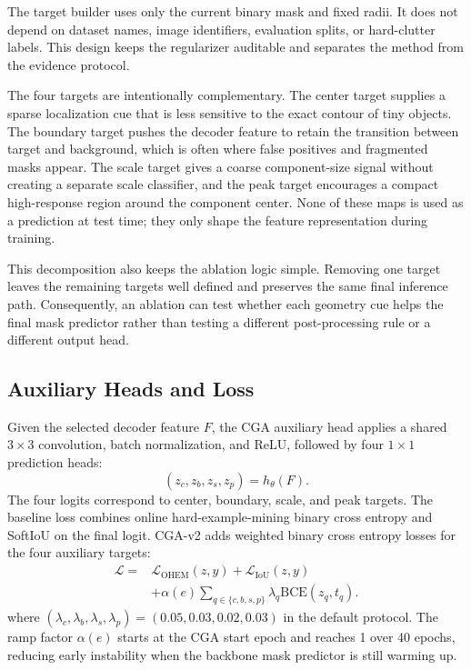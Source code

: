 \documentclass[letterpaper]{article}
\begin{document}
The target builder uses only the current binary mask and fixed radii. It does not depend on dataset names, image identifiers, evaluation splits, or hard-clutter labels. This design keeps the regularizer auditable and separates the method from the evidence protocol.

The four targets are intentionally complementary. The center target supplies a sparse localization cue that is less sensitive to the exact contour of tiny objects. The boundary target pushes the decoder feature to retain the transition between target and background, which is often where false positives and fragmented masks appear. The scale target gives a coarse component-size signal without creating a separate scale classifier, and the peak target encourages a compact high-response region around the component center. None of these maps is used as a prediction at test time; they only shape the feature representation during training.

This decomposition also keeps the ablation logic simple. Removing one target leaves the remaining targets well defined and preserves the same final inference path. Consequently, an ablation can test whether each geometry cue helps the final mask predictor rather than testing a different post-processing rule or a different output head.

\subsection{Auxiliary Heads and Loss}

Given the selected decoder feature $F$, the CGA auxiliary head applies a shared $3 \times 3$ convolution, batch normalization, and ReLU, followed by four $1 \times 1$ prediction heads:
\begin{equation}
(z_c, z_b, z_s, z_p) = h_{\theta}(F).
\end{equation}
The four logits correspond to center, boundary, scale, and peak targets. The baseline loss combines online hard-example-mining binary cross entropy and SoftIoU on the final logit. CGA-v2 adds weighted binary cross entropy losses for the four auxiliary targets:
\begin{equation}
\begin{aligned}
\mathcal{L} ={}& \mathcal{L}_{\mathrm{OHEM}}(z,y)
 + \mathcal{L}_{\mathrm{IoU}}(z,y) \\
& + \alpha(e) \sum_{q \in \{c,b,s,p\}}
 \lambda_q \mathrm{BCE}(z_q,t_q).
\end{aligned}
\end{equation}
where $(\lambda_c,\lambda_b,\lambda_s,\lambda_p)=(0.05,0.03,0.02,0.03)$ in the default protocol. The ramp factor $\alpha(e)$ starts at the CGA start epoch and reaches 1 over 40 epochs, reducing early instability when the backbone mask predictor is still warming up.
\end{document}
